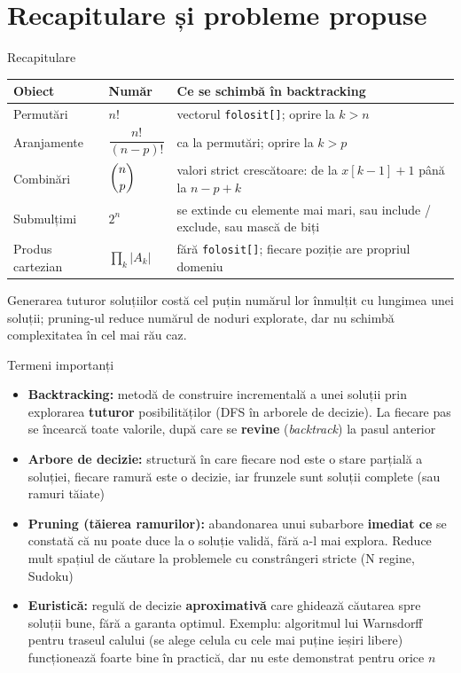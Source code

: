 \documentclass[8pt,mathserif]{beamer}
\begin{document}
\section{Recapitulare și probleme propuse}

\begin{frame}{Recapitulare}
  \renewcommand{\arraystretch}{1.45}
  \begin{tabular}{@{}p{}p{}p{}@{}}
    \toprule
    \textbf{Obiect} & \textbf{Număr} & \textbf{Ce se schimbă în backtracking} \\
    \midrule
    Permutări & $n!$ & vectorul \texttt{folosit[]}; oprire la $k > n$ \\
    Aranjamente & $\dfrac{n!}{(n-p)!}$ & ca la permutări; oprire la $k > p$ \\
    Combinări & $\dbinom{n}{p}$ & valori strict crescătoare: de la $x[k-1] + 1$ până la $n - p + k$ \\
    Submulțimi & $2^n$ & se extinde cu elemente mai mari, sau include / exclude, sau mască de biți \\
    Produs cartezian & $\displaystyle\prod_k |A_k|$ & fără \texttt{folosit[]}; fiecare poziție are propriul domeniu \\
    \bottomrule
  \end{tabular}
  \smallskip

  Generarea tuturor soluțiilor costă cel puțin numărul lor înmulțit cu lungimea unei soluții; pruning-ul reduce numărul de noduri explorate, dar nu schimbă complexitatea în cel mai rău caz.
\end{frame}

\begin{frame}{Termeni importanți}
  \begin{itemize}
    \item \textbf{Backtracking:} metodă de construire incrementală a unei soluții prin explorarea \textbf{tuturor} posibilităților (DFS în arborele de decizie). La fiecare pas se încearcă toate valorile, după care se \textbf{revine} (\textit{backtrack}) la pasul anterior
    \item \textbf{Arbore de decizie:} structură în care fiecare nod este o stare parțială a soluției, fiecare ramură este o decizie, iar frunzele sunt soluții complete (sau ramuri tăiate)
    \item \textbf{Pruning (tăierea ramurilor):} abandonarea unui subarbore \textbf{imediat ce} se constată că nu poate duce la o soluție validă, fără a-l mai explora. Reduce mult spațiul de căutare la problemele cu constrângeri stricte (N regine, Sudoku)
    \item \textbf{Euristică:} regulă de decizie \textbf{aproximativă} care ghidează căutarea spre soluții bune, fără a garanta optimul. Exemplu: algoritmul lui Warnsdorff pentru traseul calului (se alege celula cu cele mai puține ieșiri libere) funcționează foarte bine în practică, dar nu este demonstrat pentru orice $n$
  \end{itemize}
\end{frame}
\end{document}
